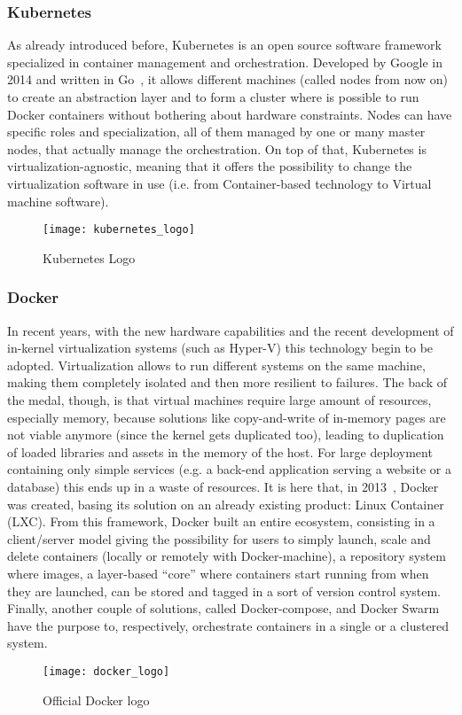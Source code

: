 \subsubsection{Kubernetes}

As already introduced before, Kubernetes is an open source software framework
specialized in container management and orchestration. Developed by Google in
2014 and written in Go~\cite{k8sGit}, it allows different machines (called nodes
from now on) to create an abstraction layer and to form a cluster where is
possible to run Docker containers without bothering about hardware constraints.
Nodes can have specific roles and specialization, all of them managed by one or
many master nodes, that actually manage the orchestration. On top of that,
Kubernetes is virtualization-agnostic, meaning that it offers the possibility to
change the virtualization software in use (i.e. from Container-based technology
to Virtual machine software).
\begin{figure}[h]
 \centering \texttt{[image: kubernetes\_logo]}
 \caption{Kubernetes Logo}
 \label{chap:intro:img:k8s_logo}
\end{figure}


\subsubsection{Docker}

In recent years, with the new hardware capabilities and the recent development
of in-kernel virtualization systems (such as Hyper-V) this technology begin to
be adopted. Virtualization allows to run different systems on the same machine,
making them completely isolated and then more resilient to failures. The back of
the medal, though, is that virtual machines require large amount of resources,
especially memory, because solutions like copy-and-write of in-memory pages are
not viable anymore (since the kernel gets duplicated too), leading to
duplication of loaded libraries and assets in the memory of the host. For large
deployment containing only simple services (e.g. a back-end application serving
a website or a database) this ends up in a waste of resources.  It is here that,
in 2013~\cite{dockerWebsite}, Docker was created, basing its solution on an
already existing product: Linux Container (LXC). From this framework, Docker
built an entire ecosystem, consisting in a client/server model giving the
possibility for users to simply launch, scale and delete containers (locally or
remotely with Docker-machine), a repository system where images, a layer-based
``core'' where containers start running from when they are launched, can be
stored and tagged in a sort of version control system. Finally, another couple
of solutions, called Docker-compose, and Docker Swarm have the purpose to,
respectively, orchestrate containers in a single or a clustered system.
\begin{figure}[t]
 \centering \texttt{[image: docker\_logo]}
 \caption{Official Docker logo}
 \label{chap:intro:img:docker_logo}
\end{figure}

